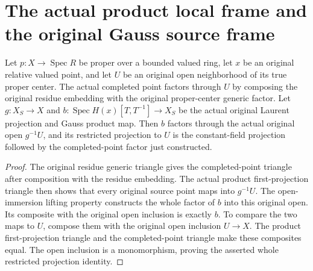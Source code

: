 \section{The actual product local frame and the original Gauss source frame}

\begin{definition}\label{def:fc-point-laurent-local-open-factor}
\leanok
{}
Let $p:X\to\operatorname{Spec}R$ be proper over a bounded valued ring,
let $x$ be an original relative valued point, and let $U$ be an
original open neighborhood of its true proper center. The actual
completed point factors through $U$ by composing the original
residue embedding with the original proper-center generic factor.
Let $g:X_S\to X$ and $b:\operatorname{Spec}H(x)[T,T^{-1}]\to X_S$
be the actual original Laurent projection and Gauss product map.
Then $b$ factors through the actual original open $g^{-1}U$, and
its restricted projection to $U$ is the constant-field projection
followed by the completed-point factor just constructed.
\end{definition}
\begin{proof}
The original residue generic triangle gives the completed-point
triangle after composition with the residue embedding. The actual
product first-projection triangle then shows that every original
source point maps into $g^{-1}U$. The open-immersion lifting property
constructs the whole factor of $b$ into this original open. Its
composite with the original open inclusion is exactly $b$. To
compare the two maps to $U$, compose them with the original open
inclusion $U\to X$. The product first-projection triangle and the
completed-point triangle make these composites equal. The open
inclusion is a monomorphism, proving the asserted whole restricted
projection identity.
\end{proof}

